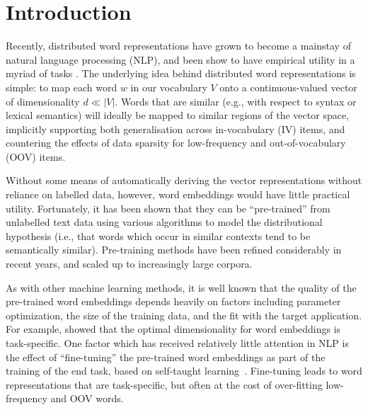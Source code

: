 \section{Introduction}

Recently, distributed word representations have grown to become a
mainstay of natural language processing (NLP), and been show to have
empirical utility in a myriad of tasks
\cite{Collobert2008,turian2010word,baroni:2014,Andreas:Klein:2014}.  The
underlying idea behind distributed word representations is simple: to
map each word $w$ in our vocabulary $V$ onto a continuous-valued vector
of dimensionality $d \ll |V|$.  Words that are similar
(e.g., with respect to syntax or lexical semantics) will ideally be mapped to
similar regions of the vector space, implicitly supporting both
generalisation across in-vocabulary (IV) items, and countering the
effects of data sparsity for low-frequency and out-of-vocabulary (OOV)
items.

Without some means of automatically deriving the vector representations
without reliance on labelled data, however, word embeddings would have
little practical utility. Fortunately, it has been shown that they can
be ``pre-trained'' from unlabelled text data using various algorithms 
to model the distributional hypothesis (i.e., that
words which occur in similar contexts tend to be semantically
similar). Pre-training methods have been refined considerably in recent
years, and scaled up to increasingly large corpora.

As with other machine learning methods, it is well known that the
quality of the pre-trained word embeddings depends heavily on factors
including parameter optimization, the size of the training data, and the
fit with the target application. For example, 
showed that the optimal dimensionality for word embeddings is task-specific.  
One factor which has received relatively little attention in
NLP is the effect of ``fine-tuning'' the pre-trained word embeddings as
part of the training of the end task, based on self-taught
learning~\cite{raina2007self}.  Fine-tuning leads to word
representations that are task-specific, but often at the cost of
over-fitting low-frequency and OOV words.


